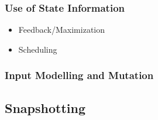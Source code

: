 \documentclass{article}
\begin{document}
\begin{multicols}{2}
  \subsubsection{Use of State Information}
  \begin{itemize}
    \item Feedback/Maximization
    \item Scheduling
  \end{itemize}

  \subsubsection{Input Modelling and Mutation}


  \subsection{Snapshotting}



\end{multicols}
\end{document}
